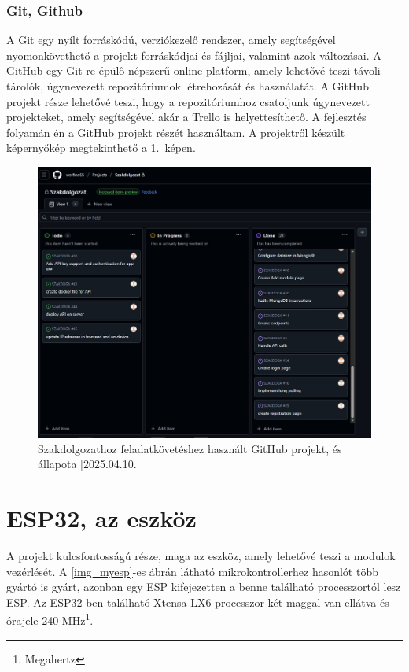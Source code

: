 \documentclass{thesis-ekf}
\theoremstyle{definition}
\theoremstyle{remark}
\begin{document}
	\subsection{Git, Github}
	A Git egy nyílt forráskódú, verziókezelő rendszer, amely segítségével nyomonkövethető a projekt forráskódjai és fájljai, valamint azok változásai. A GitHub egy Git-re épülő népszerű online platform, amely lehetővé teszi távoli tárolók, úgynevezett repozitóriumok létrehozását és használatát. A GitHub projekt része lehetővé teszi, hogy a repozitóriumhoz csatoljunk úgynevezett projekteket, amely segítségével akár a Trello is helyettesíthető. A fejlesztés folyamán én a GitHub projekt részét használtam. A projektről készült képernyőkép megtekinthető a \ref{img_git}.~képen.
	\begin{figure}[!ht]
		\centering
		\includegraphics[width=15cm]{github_project}
		\caption{Szakdolgozathoz feladatkövetéshez használt GitHub projekt, és állapota [2025.04.10.]}
		\label{img_git}
	\end{figure}
	\chapter{ESP32, az eszköz}
	\label{ch_esp}
	A projekt kulcsfontosságú része, maga az eszköz, amely lehetővé teszi a modulok vezérlését. A \ref{img_myesp}-es ábrán látható mikrokontrollerhez hasonlót több gyártó is gyárt, azonban egy ESP kifejezetten a benne található processzortól lesz ESP. Az ESP32-ben található Xtensa LX6 processzor két maggal van ellátva és órajele 240 MHz\footnote{Megahertz}.
\end{document}
